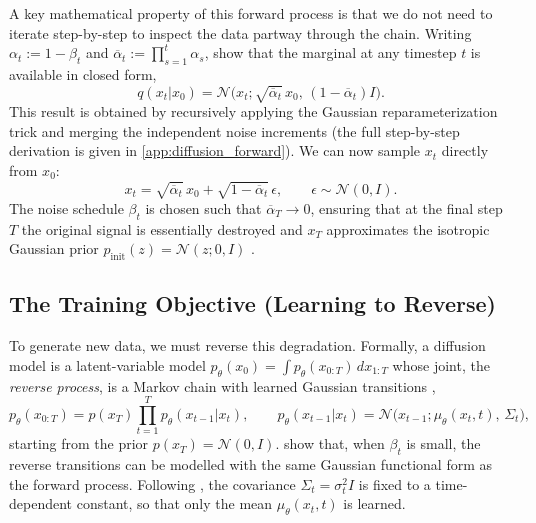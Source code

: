 A key mathematical property of this forward process is that we do not need to iterate step-by-step to inspect the data partway through the chain. Writing $\alpha_t := 1 - \beta_t$ and $\overline{\alpha}_{t} := \prod_{s=1}^{t}\alpha_{s}$, \textcite{ho_denoising_2020} show that the marginal at any timestep $t$ is available in closed form,
\begin{equation}
\label{eq:forward_marginal}
    q(x_t | x_0) = \mathcal{N}\big(x_t; \sqrt{\overline{\alpha}_t}\,x_0,\, (1-\overline{\alpha}_t) I\big).
\end{equation}
This result is obtained by recursively applying the Gaussian reparameterization trick and merging the independent noise increments (the full step-by-step derivation is given in \autoref{app:diffusion_forward}). We can now sample $x_t$ directly from $x_0$:
\begin{equation}
\label{eq:forward_reparam}
    x_t = \sqrt{\overline{\alpha}_{t}}\,x_{0} + \sqrt{1-\overline{\alpha}_{t}}\,\epsilon, \qquad \epsilon \sim \mathcal{N}(0, I).
\end{equation}
The noise schedule $\beta_t$ is chosen such that $\overline{\alpha}_T \to 0$, ensuring that at the final step $T$ the original signal is essentially destroyed and $x_{T}$ approximates the isotropic Gaussian prior $p_{\mathrm{init}}(z) = \mathcal{N}(z; 0, I)$ \parencite{ho_denoising_2020}.

\subsection{The Training Objective (Learning to Reverse)}
To generate new data, we must reverse this degradation. Formally, a diffusion model is a latent-variable model $p_\theta(x_0) = \int p_\theta(x_{0:T})\,dx_{1:T}$ whose joint, the \emph{reverse process}, is a Markov chain with learned Gaussian transitions \parencite{sohl2015thermo, ho_denoising_2020},
\begin{equation}
\label{eq:reverse_process}
    p_\theta(x_{0:T}) = p(x_T) \prod_{t=1}^{T} p_\theta(x_{t-1} | x_t),
    \qquad
    p_\theta(x_{t-1} | x_t) = \mathcal{N}\big(x_{t-1}; \mu_\theta(x_t, t),\, \Sigma_t\big),
\end{equation}
starting from the prior $p(x_T) = \mathcal{N}(0, I)$. \textcite{sohl2015thermo} show that, when $\beta_t$ is small, the reverse transitions can be modelled with the same Gaussian functional form as the forward process. Following \textcite{ho_denoising_2020}, the covariance $\Sigma_t = \sigma_t^2 I$ is fixed to a time-dependent constant, so that only the mean $\mu_\theta(x_t, t)$ is learned.

